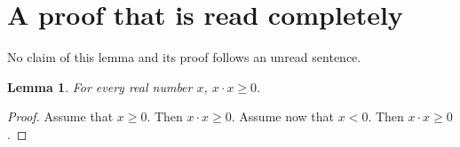 \documentclass{article}
\newtheorem{lemma}{Lemma}
\begin{document}
\section{A proof that is read completely}

No claim of this lemma and its proof follows an unread sentence.

\begin{lemma}\label{complete}
For every real number $x$, $x\cdot x\ge0$.
\end{lemma}
\begin{proof}
Assume that $x\ge0$. Then $x\cdot x\ge0$. Assume now that $x<0$. Then $x\cdot x\ge0$.
\end{proof}
\end{document}

